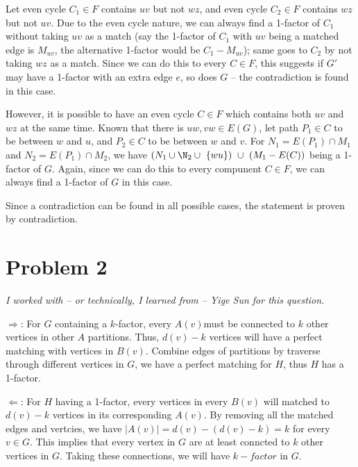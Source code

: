 \documentclass[11pt]{article}
\begin{document}
Let even cycle $C_1 \in F$ contains $uv$ but not $wz$, and even cycle $C_2 \in F$ contains $wz$ but not $uv$. Due to the even cycle nature, we can always find a 1-factor of $C_1$ without taking $uv$ as a match (say the 1-factor of $C_1$ with $uv$ being a matched edge is $M_{uv}$, the alternative 1-factor would be $C_1 - M_{uv}$); same goes to $C_2$ by not taking $wz$ as a match. Since we can do this to every $C \in F$, this suggests if $G'$ may have a 1-factor with an extra edge $e$, so does $G$ -- the contradiction is found in this case.

However, it is possible to have an even cycle $C \in F$ which contains both $uv$ and $wz$ at the same time. Known that there is $uw, vw \in E(G)$, let path $P_1 \in C$ to be between $w$ and $u$, and $P_2 \in C$ to be between $w$ and $v$. For $N_1 = E(P_1) \cap M_1$ and $N_2 = E(P_1) \cap M_2$, we have $(N_1 \cup \N_2 \cup \ \{wu\})  \ \cup \ (M_1 - E(C))$ being a 1-factor of $G$. Again, since we can do this to every compunent $C \in F$, we can always find a 1-factor of $G$ in this case.\newline

Since a contradiction can be found in all possible cases, the statement is proven by contradiction.








\section{Problem 2}

\textit{I worked with -- or technically, I learned from -- Yige Sun for this question.}\newline

$\Longrightarrow$: For $G$ containing a $k$-factor, every $A(v) $must be connected to $k$ other vertices in other $A$ partitions. Thus, $d(v) - k$ vertices will have a perfect matching with vertices in $B(v)$. Combine edges of partitions by traverse through different vertices in $G$, we have a perfect matching for $H$, thus $H$ has a 1-factor.\newline

$\Longleftarrow$: For $H$ having a 1-factor, every vertices in every $B(v)$ will matched to $d(v)-k$ vertices in its corresponding $A(v)$. By removing all the matched edges and vertcies, we have $|A(v)| = d(v) - (d(v) - k) = k$ for every $v \in G$. This implies that every vertex in $G$ are at least conncted to $k$ other vertices in $G$. Taking these connections, we will have $k-factor$ in $G$.


%
% 
% 
\end{document}
